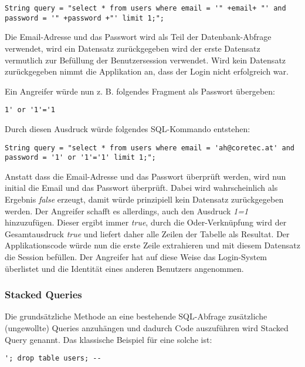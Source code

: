 \begin{verbatim}
String query = "select * from users where email = '" +email+ "' and password = '" +password +"' limit 1;";
\end{verbatim}

Die Email-Adresse und das Passwort wird als Teil der Datenbank-Abfrage verwendet, wird ein Datensatz zurückgegeben wird der erste Datensatz vermutlich zur Befüllung der Benutzersession verwendet. Wird kein Datensatz zurückgegeben nimmt die Applikation an, dass der Login nicht erfolgreich war.

Ein Angreifer würde nun z. B. folgendes Fragment als Passwort übergeben:

\begin{verbatim}
1' or '1'='1
\end{verbatim}

Durch diesen Ausdruck würde folgendes SQL-Kommando entstehen:

\begin{verbatim}
String query = "select * from users where email = 'ah@coretec.at' and password = '1' or '1'='1' limit 1;";
\end{verbatim}

Anstatt dass die Email-Adresse und das Passwort überprüft werden, wird nun initial die Email und das Passwort überprüft. Dabei wird wahrscheinlich als Ergebnis \textit{false} erzeugt, damit würde prinzipiell kein Datensatz zurückgegeben werden. Der Angreifer schafft es allerdings, auch den Ausdruck \textit{1=1} hinzuzufügen. Dieser ergibt immer \textit{true}, durch die Oder-Verknüpfung wird der Gesamtausdruck \textit{true} und liefert daher alle Zeilen der Tabelle als Resultat. Der Applikationscode würde nun die erste Zeile extrahieren und mit diesem Datensatz die Session befüllen. Der Angreifer hat auf diese Weise das Login-System überlistet und die Identität eines anderen Benutzers angenommen.

\subsubsection{Stacked Queries}

Die grundsätzliche Methode an eine bestehende SQL-Abfrage zusätzliche (ungewollte) Queries anzuhängen und dadurch Code auszuführen wird Stacked Query genannt. Das klassische Beispiel für eine solche ist:

\begin{verbatim}
'; drop table users; --
\end{verbatim}

